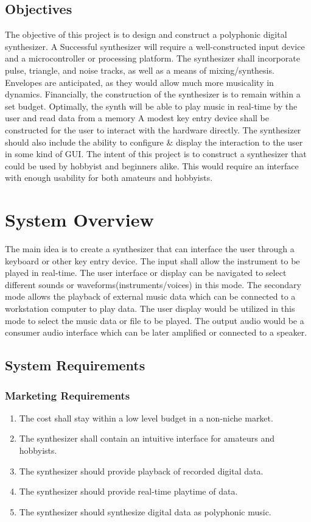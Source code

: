 \documentclass[bibtotocnumbered,abstract=on,paper=a4,fontsize=12pt,parskip=on,halfparskip=on]{scrartcl}		%
\begin{document}
  \subsection{Objectives}
The objective of this project is to design and construct a polyphonic digital synthesizer. A Successful synthesizer will require a well-constructed input device and a microcontroller or processing platform. The synthesizer shall incorporate pulse, triangle, and noise tracks, as well as a means of mixing/synthesis. Envelopes are anticipated, as they would allow much more musicality in dynamics. Financially, the construction of the synthesizer is to remain within a set budget. Optimally, the synth will be able to play music in real-time by the user and read data from a memory A modest key entry device shall be constructed for the user to interact with the hardware directly. The synthesizer should also include the ability to configure \& display the interaction to the user in some kind of GUI. The intent of this project is to construct a synthesizer that could be used by hobbyist and beginners alike. This would require an interface with enough usability for both amateurs and hobbyists.
\clearpage
\section{System Overview}
The main idea is to create a synthesizer that can interface the user through a keyboard or other key entry device. The input shall allow the instrument to be played in real-time. The user interface or display can be navigated to select different sounds or waveforms(instruments/voices) in this mode. The secondary mode allows the playback of external music data which can be connected to a workstation computer to play data. The user display would be utilized in this mode to select the music data or file to be played. The output audio would be a consumer audio interface which can be later amplified or connected to a speaker.

  \subsection{System Requirements}
    \subsubsection{Marketing Requirements}
      \begin{enumerate}
        \item The cost shall stay within a low level budget in a non-niche market.
        \item The synthesizer shall contain an intuitive interface for amateurs and hobbyists.
        \item The synthesizer should provide playback of recorded digital data.
        \item The synthesizer should provide real-time playtime of data.
        \item The synthesizer should synthesize digital data as polyphonic music.
      \end{enumerate}
\end{document}
